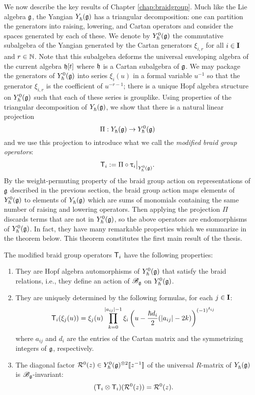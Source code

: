 We now describe the key results of Chapter \ref{chap:braidgroup}.
Much like the Lie algebra $\g$, the Yangian $\Yhg$ has a triangular decomposition: one can partition the generators into raising, lowering, and Cartan operators and consider the spaces generated by each of these.
We denote by $\Yhg[0]$ the commutative subalgebra of the Yangian generated by the Cartan generators $\xi_{i,r}$ for all $i\in\I$ and $r\in\N$.
Note that this subalgebra deforms the universal enveloping algebra of the current algebra $\h[t]$ where $\h$ is a Cartan subalgebra of $\g$.
We may package the generators of $\Yhg[0]$ into series $\xi_i(u)$ in a formal variable $u^{-1}$ so that the generator $\xi_{i,r}$ is the coefficient of $u^{-r-1}$; there is a unique Hopf algebra structure on $\Yhg[0]$ such that each of these series is grouplike.
Using properties of the triangular decomposition of $\Yhg$, we show that there is a natural linear projection
\[\Pi:\Yhg\to\Yhg[0]\]
and we use this projection to introduce what we call the \emph{modified braid group operators}:
\[\mbraid_i := \Pi\circ\braid_i\big|_{\Yhg[0]}.\]
By the weight-permuting property of the braid group action on representations of $\g$ described in the previous section, the braid group action maps elements of $\Yhg[0]$ to elements of $\Yhg$ which are sums of monomials containing the same number of raising and lowering operators.
Then applying the projection $\Pi$ discards terms that are not in $\Yhg[0]$, so the above operators are endomorphisms of $\Yhg[0]$.
In fact, they have many remarkable properties which we summarize in the theorem below.
This theorem constitutes the first main result of the thesis.

\begin{theorem}\label{T:intro-main1}
    The modified braid group operators $\mbraid_i$ have the following properties:
    \begin{enumerate}
        \item They are Hopf algebra automorphisms of $\Yhg[0]$ that satisfy the braid relations, i.e., they define an action of $\Bg$ on $\Yhg[0]$.
        \item They are uniquely determined by the following formulas, for each $j\in\I$:
        \[\mbraid_i(\xi_j(u)) = \xi_j(u)\prod_{k=0}^{\abs{a_{ij}}-1} \xi_i\left(u-\frac{\hbar d_i}{2}(\abs{a_{ij}}-2k)\right)^{(-1)^{\delta_{ij}}}\]
        where $a_{ij}$ and $d_i$ are the entries of the Cartan matrix and the symmetrizing integers of $\g$, respectively.
        \item The diagonal factor $\rmat^0(z)\in \Yhg[0]^{\otimes 2}\db{z^{-1}}$ of the universal $R$-matrix of $\Yhg$ is $\Bg$-invariant:
        \[(\mbraid_i\otimes\mbraid_i)(\rmat^0(z)) = \rmat^0(z).\]
    \end{enumerate}
\end{theorem}

